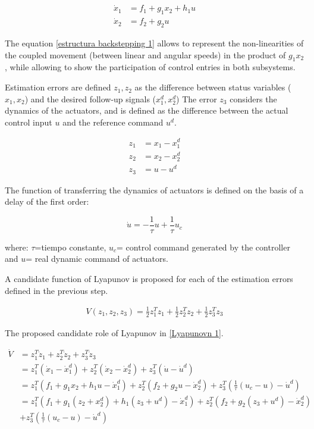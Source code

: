 \begin{align}
\label{estructura backstepping 1}
    \dot x_{1} &= f_{1} + g_1 x_2 + h_1 u \\ \nonumber
    \dot x_{2} &= f_{2} + g_2 u
\end{align}

The equation \ref{estructura backstepping 1} allows to represent the non-linearities of the coupled movement (between linear and angular speeds) in the product of $g_1 x_2$, while allowing to show the participation of control entries in both subsystems. 

Estimation errors are defined $z_1, z_2$ as the difference between status variables ($x_1, x_2$) and the desired follow-up signals ($x_1^d, x_2^d$) The error $z_3$ considers the dynamics of the actuators, and is defined as the difference between the actual control input $u$ and the reference command $u^d$.

\begin{align}
    z_1 &= x_1 - x^d_1 \\
    z_2 &= x_2 - x^d_2 \\
    z_3 &= u - u^d
\end{align}

The function of transferring the dynamics of actuators is defined on the basis of a delay of the first order: 

\begin{equation}
    \dot u = - \frac{1}{\tau}u + \frac{1}{\tau} u_c
\end{equation}

where: $\tau$=tiempo constante, $u_{c}$= control command generated by the controller and $u$= real dynamic command of actuators. 

A candidate function of Lyapunov is proposed for each of the estimation errors defined in the previous step.

\begin{gather}
\label{Lyapunovn 1}
    V (z_1, z_2, z_3) =\frac{1}{2} z^T_1 z_1 + \frac{1}{2} z^T_2 z_2 + \frac{1}{2} z^T_3 z_3
\end{gather}

 The proposed candidate role of Lyapunov in \ref{Lyapunovn 1}.

\begin{align}
       \dot V &= z^T_1 \dot z_1 + z^T_2 \dot z_2 + z^T_3 \dot z_3 \nonumber \\
        &= z^T_1 (\dot x_1 - \dot x^d_1) + z^T_2 (\dot x_2 - \dot x^d_2) + z^T_3 (\dot u - \dot u^d) \nonumber \\ 
    &= z^T_1 (f_1 + g_{1} x_2 + h_1 u - \dot x^d_1) + z^T_2 (f_2 + g_{2} u - \dot x^d_2) + z^T_3 (\frac{1}{\tau}(u_c - u) - \dot u^d) \nonumber \\
    &= z^T_1 (f_1 + g_{1} (z_2 + x_{2}^d) + h_1 (z_3 + u^d) - \dot x^d_1) + z^T_2 (f_2 + g_{2} (z_3 + u^d) - \dot x^d_2)\nonumber \\
    &+ z^T_3 (\frac{1}{\tau}(u_c - u) - \dot u^d)
\end{align}

